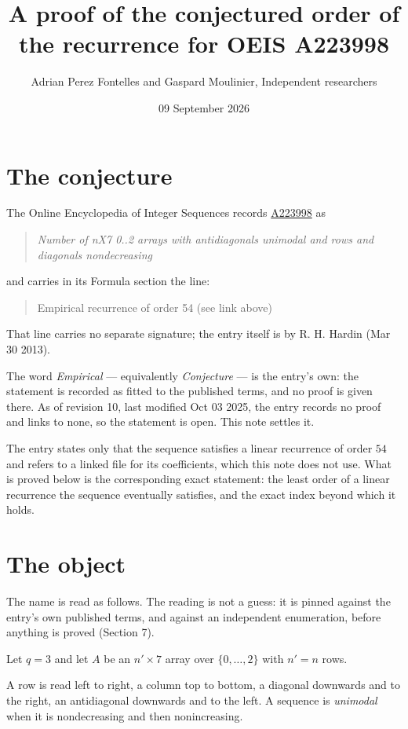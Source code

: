 \documentclass[11pt]{article}
\title{A proof of the conjectured order of the recurrence for OEIS A223998}
\author{Adrian Perez Fontelles and Gaspard Moulinier, Independent researchers}
\date{09 September 2026}
\theoremstyle{definition}
\begin{document}
\maketitle
\section{The conjecture}

The Online Encyclopedia of Integer Sequences records \href{https://oeis.org/A223998}{A223998} as

\begin{quote}\itshape Number of nX7 0..2 arrays with antidiagonals unimodal and rows and diagonals nondecreasing\end{quote}

and carries in its Formula section the line:

\begin{quote}\ttfamily Empirical recurrence of order 54 (see link above)\end{quote}

That line carries no separate signature; the entry itself is by R. H. Hardin (Mar 30 2013).

The word {\itshape Empirical} --- equivalently {\itshape Conjecture} --- is the entry's own: the statement is recorded as fitted to the published terms, and no proof is given there. As of revision 10, last modified Oct 03 2025, the entry records no proof and links to none, so the statement is open. This note settles it.

The entry states only that the sequence satisfies a linear recurrence of order $54$ and refers to a linked file for its coefficients, which this note does not use. What is proved below is the corresponding exact statement: the least order of a linear recurrence the sequence eventually satisfies, and the exact index beyond which it holds.

\section{The object}

The name is read as follows. The reading is not a guess: it is pinned against the entry's own published terms, and against an independent enumeration, before anything is proved (Section 7).

Let $q = 3$ and let $A$ be an $n' \times 7$ array over $\{0,\dots,2\}$ with $n' = n$ rows.

A row is read left to right, a column top to bottom, a diagonal downwards and to the right, an antidiagonal downwards and to the left. A sequence is {\itshape unimodal} when it is nondecreasing and then nonincreasing.
\end{document}
